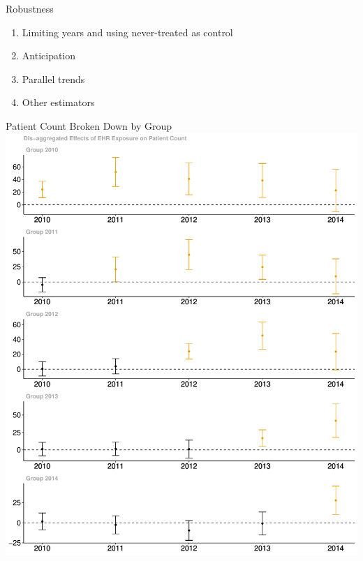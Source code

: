 \documentclass[notes,11pt, aspectratio=169]{beamer}
\begin{document}
\begin{frame}[noframenumbering, label=ch1robustness]{Robustness}
\label{Robustness}
\begin{enumerate}
    \item Limiting years and using never-treated as control
            \vspace{3mm}
    \item Anticipation
            \vspace{3mm}
    \item Parallel trends
            \vspace{3mm}
    \item Other estimators
    \vspace{5mm}
    

\hyperlink{Lee (2009) Bounds}{}
\hyperlink{TWFE}{}
\hyperlink{Other Estimators for Staggered Treatment}{}
\end{enumerate}
\end{frame}




\begin{frame}[noframenumbering]{Patient Count Broken Down by Group}
\label{patient count broken down by group}
\centering
    \includegraphics[scale=.25]{Objects/patient_group.pdf}
\hyperlink{Results: Patient Count}{}
\end{frame}
\end{document}
